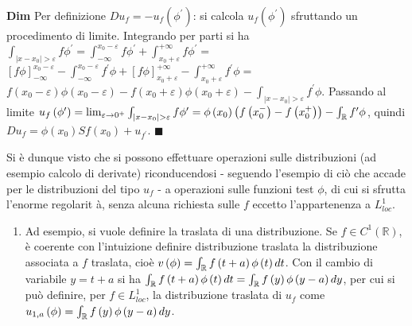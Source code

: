 \documentclass{article}
\begin{document}
\textbf{Dim} Per definizione $Du_{f}=-u_{f}\left( \phi ^{\prime }\right) $:
si calcola $u_{f}\left( \phi ^{\prime }\right) $ sfruttando un procedimento
di limite. Integrando per parti si ha $\int_{\left\vert x-x_{0}\right\vert
>\varepsilon }f\phi ^{\prime }=\int_{-\infty }^{x_{0}-\varepsilon }f\phi
^{\prime }+\int_{x_{0}+\varepsilon }^{+\infty }f\phi ^{\prime }=$ $\left[
f\phi \right] _{-\infty }^{x_{0}-\varepsilon }-\int_{-\infty
}^{x_{0}-\varepsilon }f^{\prime }\phi +\left[ f\phi \right]
_{x_{0}+\varepsilon }^{+\infty }-\int_{x_{0}+\varepsilon }^{+\infty
}f^{\prime }\phi =$ $f\left( x_{0}-\varepsilon \right) \phi \left(
x_{0}-\varepsilon \right) -f\left( x_{0}+\varepsilon \right) \phi \left(
x_{0}+\varepsilon \right) -\int_{\left\vert x-x_{0}\right\vert >\varepsilon
}f^{\prime }\phi $. Passando al limite $u_{f}\left( \phi ^{\prime }\right)
=\lim_{\varepsilon \rightarrow 0^{+}}\int_{\left\vert x-x_{0}\right\vert
>\varepsilon }f\phi ^{\prime }=\phi \left( x_{0}\right) \left( f\left(
x_{0}^{-}\right) -f\left( x_{0}^{+}\right) \right) -\int_{%
\mathbb{R}
}f^{\prime }\phi $, quindi $Du_{f}=\phi \left( x_{0}\right) Sf\left(
x_{0}\right) +u_{f^{\prime }}$. $\blacksquare $

Si \`{e} dunque visto che si possono effettuare operazioni sulle
distribuzioni (ad esempio calcolo di derivate) riconducendosi - seguendo
l'esempio di ci\`{o} che accade per le distribuzioni del tipo $u_{f}$ - a
operazioni sulle funzioni test $\phi $, di cui si sfrutta l'enorme regolarit%
\`{a}, senza alcuna richiesta sulle $f$ eccetto l'appartenenza a $%
L_{loc}^{1} $.

\begin{enumerate}
\item Ad esempio, si vuole definire la traslata di una distribuzione. Se $%
f\in C^{1}\left( 
\mathbb{R}
\right) $, \`{e} coerente con l'intuizione definire distribuzione traslata
la distribuzione associata a $f$ traslata, cio\`{e} $v\left( \phi \right)
=\int_{%
\mathbb{R}
}f\left( t+a\right) \phi \left( t\right) dt$. Con il cambio di variabile $%
y=t+a$ si ha $\int_{%
\mathbb{R}
}f\left( t+a\right) \phi \left( t\right) dt=\int_{%
\mathbb{R}
}f\left( y\right) \phi \left( y-a\right) dy$, per cui si pu\`{o} definire,
per $f\in L_{loc}^{1}$, la distribuzione traslata di $u_{f}$ come $%
u_{1,a}\left( \phi \right) =\int_{%
\mathbb{R}
}f\left( y\right) \phi \left( y-a\right) dy$.
\end{enumerate}
\end{document}
